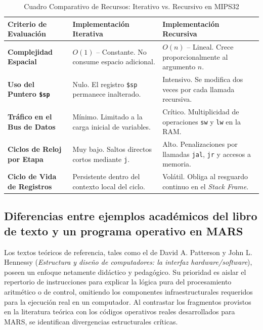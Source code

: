 \documentclass[12pt,letterpaper]{article}
\begin{document}
\begin{table}[h!]
\centering
\caption{Cuadro Comparativo de Recursos: Iterativo vs. Recursivo en MIPS32}
\vspace{0.3cm}
\begin{tabular}{l p{5.5cm} p{5.5cm}}
\toprule
\textbf{Criterio de Evaluación} & \textbf{Implementación Iterativa} & \textbf{Implementación Recursiva} \\
\midrule
\textbf{Complejidad Espacial} & $O(1)$ -- Constante. No consume espacio adicional. & $O(n)$ -- Lineal. Crece proporcionalmente al argumento $n$. \\
\midrule
\textbf{Uso del Puntero \texttt{\$sp}} & Nulo. El registro \texttt{\$sp} permanece inalterado. & Intensivo. Se modifica dos veces por cada llamada recursiva. \\
\midrule
\textbf{Tráfico en el Bus de Datos} & Mínimo. Limitado a la carga inicial de variables. & Crítico. Multiplicidad de operaciones \texttt{sw} y \texttt{lw} en la RAM. \\
\midrule
\textbf{Ciclos de Reloj por Etapa} & Muy bajo. Saltos directos cortos mediante \texttt{j}. & Alto. Penalizaciones por llamadas \texttt{jal}, \texttt{jr} y accesos a memoria. \\
\midrule
\textbf{Ciclo de Vida de Registros} & Persistente dentro del contexto local del ciclo. & Volátil. Obliga al resguardo continuo en el \textit{Stack Frame}. \\
\bottomrule
\end{tabular}
\end{table}

\subsection{Diferencias entre ejemplos académicos del libro de texto y un programa operativo en MARS}
Los textos teóricos de referencia, tales como el de David A. Patterson y John L. Hennessy (\textit{Estructura y diseño de computadores: la interfaz hardware/software}), poseen un enfoque netamente didáctico y pedagógico. Su prioridad es aislar el repertorio de instrucciones para explicar la lógica pura del procesamiento aritmético o de control, omitiendo los componentes infraestructurales requeridos para la ejecución real en un computador. Al contrastar los fragmentos provistos en la literatura teórica con los códigos operativos reales desarrollados para MARS, se identifican divergencias estructurales críticas.
\end{document}
